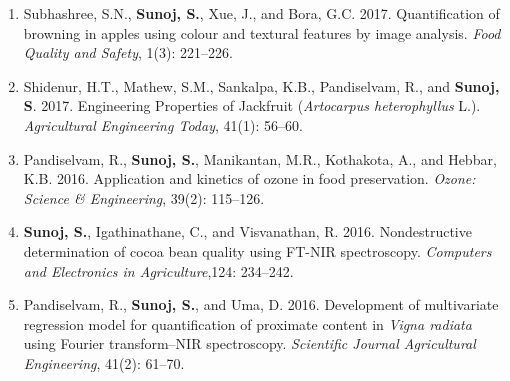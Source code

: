 \documentclass[11pt]{article}
\begin{document}
\begin{enumerate} [itemsep=-0.5ex]
\item Subhashree, S.N., \textbf{Sunoj, S.}, Xue, J., and Bora, G.C. 2017. Quantification of browning in apples using colour and textural features by image analysis. \textit{Food Quality and Safety}, 1(3): 221--226. 

\item Shidenur, H.T., Mathew, S.M., Sankalpa, K.B., Pandiselvam, R., and \textbf{Sunoj, S}. 2017. Engineering Properties of Jackfruit (\emph{Artocarpus heterophyllus} L.). \textit{Agricultural Engineering Today}, 41(1): 56--60. 

\item Pandiselvam, R., \textbf{Sunoj, S.}, Manikantan, M.R., Kothakota, A., and Hebbar, K.B. 2016. Application and kinetics of ozone in food preservation. \textit{Ozone: Science \& Engineering}, 39(2): 115--126. 

\item \textbf{Sunoj, S.}, Igathinathane, C., and Visvanathan, R. 2016. Nondestructive determination of cocoa bean quality using FT-NIR spectroscopy. \textit{Computers and Electronics in Agriculture},124: 234--242. 

\item Pandiselvam, R., \textbf{Sunoj, S.}, and Uma, D. 2016. Development of multivariate regression model for quantification of proximate content in \textit{Vigna radiata} using Fourier transform–NIR spectroscopy. \textit{Scientific Journal Agricultural Engineering}, 41(2): 61--70. 

\end{enumerate}
\end{document}
